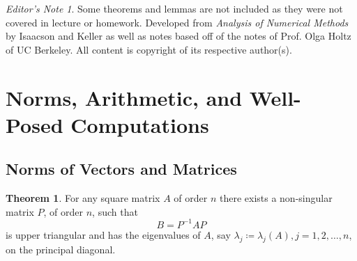 \documentclass[11pt,letterpaper]{article}
\numberwithin{figure}{section} %
\newcommand{\inv}[1]{#1^{-1}}
\theoremstyle{definition}
\newtheorem{theorem}{Theorem}[subsection]
\theoremstyle{definition}
\theoremstyle{definition}
\theoremstyle{definition}
\theoremstyle{remark}
\theoremstyle{remark}
\theoremstyle{definition}
\theoremstyle{remark}
\theoremstyle{remark}
\newtheorem*{ednote}{Editor's Note}
\begin{document}
\begin{multicols*}{3}

\begin{ednote}
	Some theorems and lemmas are not included as they were not covered in lecture
	or homework. Developed from \textit{Analysis of Numerical Methods} by
	Isaacson and Keller as well as notes based off of the notes of Prof. Olga
	Holtz of UC Berkeley. All content is copyright of its respective author(s).
\end{ednote}
\section{Norms, Arithmetic, and Well-Posed Computations}
\subsection{Norms of Vectors and Matrices}
\begin{theorem}
	For any square matrix $A$ of order $n$ there exists a non-singular matrix $P$,
	of order $n$, such that
	\[
		B = \inv{P} A P
	\]
	is upper triangular and has the eigenvalues of $A$, say $\lambda_j \coloneqq
	\lambda_j(A), j = 1, 2, \ldots, n$, on the principal diagonal.


\end{theorem}
\end{multicols*}
\end{document}
